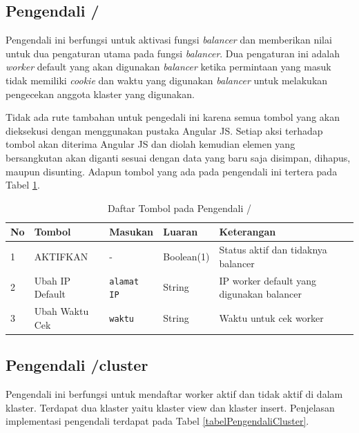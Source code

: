 \documentclass{ta-its}
\begin{document}
			\subsection{Pengendali /}
				Pengendali ini berfungsi untuk aktivasi fungsi \textit{balancer} dan memberikan nilai untuk dua pengaturan utama pada fungsi \textit{balancer}. Dua pengaturan ini adalah \textit{worker} default yang akan digunakan \textit{balancer} ketika permintaan yang masuk tidak memiliki \textit{cookie} dan waktu yang digunakan \textit{balancer} untuk melakukan pengecekan anggota klaster yang digunakan.
				
				Tidak ada rute tambahan untuk pengedali ini karena semua tombol yang akan dieksekusi dengan menggunakan pustaka Angular JS. Setiap aksi terhadap tombol akan diterima Angular JS dan diolah kemudian elemen yang bersangkutan akan diganti sesuai dengan data yang baru saja disimpan, dihapus, maupun disunting. Adapun tombol yang ada pada pengendali ini tertera pada Tabel \ref{tabelPengendaliHome}.
				
				\begin{longtable}{|p{}|p{0.2\textwidth}|p{}|p{}|p{}|} %
					
					\caption{Daftar Tombol pada Pengendali /} \label{tabelPengendaliHome} \\
					\hline
					\textbf{No} & \textbf{Tombol} & \textbf{Masukan} & \textbf{Luaran} & \textbf{Keterangan} \\ \hline
					
					\endhead
					\endfoot
					\endlastfoot
					
					1 & AKTIFKAN & - & Boolean(1) & Status aktif dan tidaknya balancer\\ \hline
					2 & Ubah IP Default & \texttt{alamat IP} & String & IP worker default yang digunakan balancer \\ \hline
					3 & Ubah Waktu Cek & \texttt{waktu} & String & Waktu untuk cek worker \\ \hline
					
				\end{longtable}
			
			\subsection{Pengendali /cluster}
				Pengendali ini berfungsi untuk mendaftar worker aktif dan tidak aktif di dalam klaster. Terdapat dua klaster yaitu klaster view dan klaster insert. Penjelasan implementasi pengendali terdapat pada Tabel \ref{tabelPengendaliCluster}.
				
\end{document}
